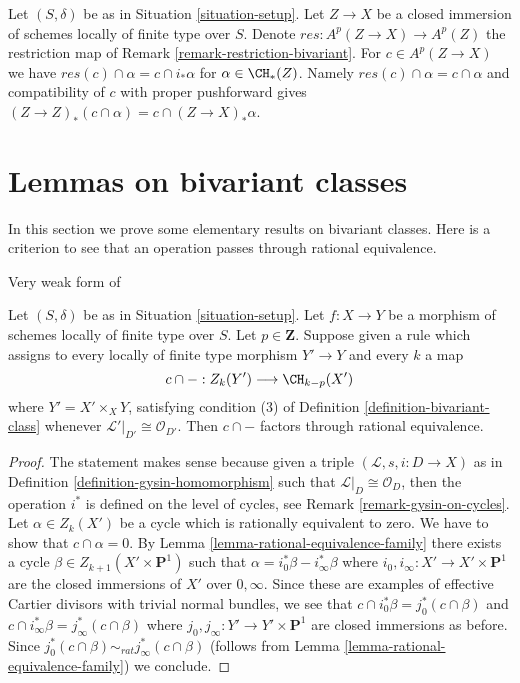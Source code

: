 \begin{remark}
\label{remark-res-push}
Let $(S, \delta)$ be as in Situation \ref{situation-setup}.
Let $Z \to X$ be a closed immersion of schemes locally of
finite type over $S$. Denote $res : A^p(Z \to X) \to A^p(Z)$
the restriction map of Remark \ref{remark-restriction-bivariant}.
For $c \in A^p(Z \to X)$ we have
$res(c) \cap \alpha = c \cap i_*\alpha$ for $\alpha \in \CH_*(Z)$.
Namely $res(c) \cap \alpha = c \cap \alpha$
and compatibility of $c$ with proper pushforward
gives $(Z \to Z)_*(c \cap \alpha) = c \cap (Z \to X)_*\alpha$.
\end{remark}






\section{Lemmas on bivariant classes}
\label{section-bivariant-II}

\noindent
In this section we prove some elementary results on bivariant classes.
Here is a criterion to see that an operation
passes through rational equivalence.

\begin{lemma}
\label{lemma-factors-through-rational-equivalence}
\begin{reference}
Very weak form of \cite[Theorem 17.1]{F}
\end{reference}
Let $(S, \delta)$ be as in Situation \ref{situation-setup}.
Let $f : X \to Y$ be a morphism of schemes locally of finite type over $S$.
Let $p \in \mathbf{Z}$. Suppose given a rule
which assigns to every locally of finite type morphism $Y' \to Y$
and every $k$ a map
$$
c \cap - : Z_k(Y') \longrightarrow \CH_{k - p}(X')
$$
where $Y' = X' \times_X Y$, satisfying condition (3) of
Definition \ref{definition-bivariant-class}
whenever $\mathcal{L}'|_{D'} \cong \mathcal{O}_{D'}$. Then
$c \cap -$ factors through rational equivalence.
\end{lemma}

\begin{proof}
The statement makes sense because given a triple
$(\mathcal{L}, s, i : D \to X)$ as in
Definition \ref{definition-gysin-homomorphism}
such that $\mathcal{L}|_D \cong \mathcal{O}_D$, then
the operation $i^*$ is defined on the level of cycles, see
Remark \ref{remark-gysin-on-cycles}.
Let $\alpha \in Z_k(X')$ be a cycle which is rationally equivalent to zero.
We have to show that $c \cap \alpha = 0$. By
Lemma \ref{lemma-rational-equivalence-family}
there exists a cycle $\beta \in Z_{k + 1}(X' \times \mathbf{P}^1)$
such that $\alpha = i_0^*\beta - i_\infty^*\beta$
where $i_0, i_\infty : X' \to X' \times \mathbf{P}^1$ are the
closed immersions of $X'$ over $0, \infty$. Since these are
examples of effective Cartier divisors with trivial normal
bundles, we see that $c \cap i_0^*\beta = j_0^*(c \cap \beta)$
and $c \cap i_\infty^*\beta = j_\infty^*(c \cap \beta)$
where $j_0, j_\infty : Y' \to Y' \times \mathbf{P}^1$ are
closed immersions as before. Since
$j_0^*(c \cap \beta) \sim_{rat} j_\infty^*(c \cap \beta)$
(follows from Lemma \ref{lemma-rational-equivalence-family}) we conclude.
\end{proof}

